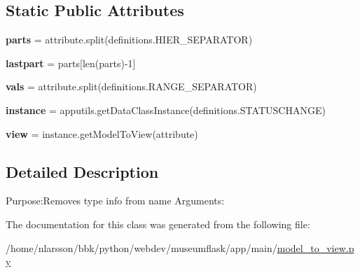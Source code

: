 \subsection*{Static Public Attributes}
\begin{DoxyCompactItemize}
\item 
\mbox{\label{classmodel__to__view_1_1Model__To__View_ad774c2f07747f51cad87361ca9b313a9}} 
{\bfseries parts} = attribute.\+split(definitions.\+H\+I\+E\+R\+\_\+\+S\+E\+P\+A\+R\+A\+T\+OR)
\item 
\mbox{\label{classmodel__to__view_1_1Model__To__View_ac891d102693096ee4f433687ae1e7002}} 
{\bfseries lastpart} = parts\mbox{[}len(parts)-\/1\mbox{]}
\item 
\mbox{\label{classmodel__to__view_1_1Model__To__View_af98c0885239c59dbf61a2e4663788b77}} 
{\bfseries vals} = attribute.\+split(definitions.\+R\+A\+N\+G\+E\+\_\+\+S\+E\+P\+A\+R\+A\+T\+OR)
\item 
\mbox{\label{classmodel__to__view_1_1Model__To__View_a40a49c8930b0a916947339102881c8cf}} 
{\bfseries instance} = apputils.\+get\+Data\+Class\+Instance(definitions.\+S\+T\+A\+T\+U\+S\+C\+H\+A\+N\+GE)
\item 
\mbox{\label{classmodel__to__view_1_1Model__To__View_a7cf2a4cede857b62cb712492bf1e2889}} 
{\bfseries view} = instance.\+get\+Model\+To\+View(attribute)
\end{DoxyCompactItemize}


\subsection{Detailed Description}
Purpose\+:Removes type info from name Arguments\+: 



The documentation for this class was generated from the following file\+:\begin{DoxyCompactItemize}
\item 
/home/nlarsson/bbk/python/webdev/museumflask/app/main/\mbox{\hyperlink{model__to__view_8py}{model\+\_\+to\+\_\+view.\+py}}\end{DoxyCompactItemize}
